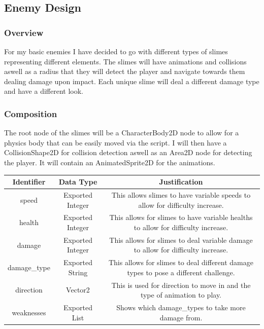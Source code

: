 \documentclass{article}
\begin{document}
        \subsection{Enemy Design}
        \subsubsection{Overview}
        For my basic enemies I have decided to go with different types of slimes representing different elements. The slimes will have animations and collisions aswell as a radius that they will detect the player and navigate towards them dealing damage upon impact. Each unique slime will deal a different damage type and have a different look.\\
        \subsubsection{Composition}
        The root node of the slimes will be a CharacterBody2D node to allow for a physics body that can be easily moved via the script. I will then have a CollisionShape2D for collision detection aswell as an Area2D node for detecting the player. It will contain an AnimatedSprite2D for the animations.\\
        \begin{tabular}{|c|c|c|}
                \hline
                Identifier&Data Type&Justification\\
                \hline
                speed&Exported Integer&This allows slimes to have variable speeds to allow for difficulty increase.\\
                \hline
                health&Exported Integer&This allows for slimes to have variable healths to allow for difficulty increase.\\
                \hline
                damage&Exported Integer&This allows for slimes to deal variable damage to allow for difficulty increase.\\
                \hline
                damage\_type&Exported String&This allows for slimes to deal different damage types to pose a different challenge.\\
                \hline
                direction&Vector2&This is used for direction to move in and the type of animation to play.\\
                \hline
                weaknesses&Exported List&Shows which damage\_types to take more damage from.\\
                \hline
        \end{tabular}
\end{document}
